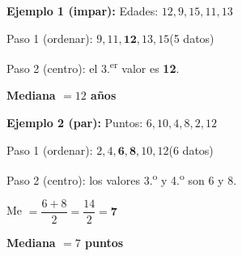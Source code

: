 \documentclass[12pt, letterpaper]{article}
\begin{document}
	\begin{ejemplo}
		\textbf{Ejemplo 1 (impar):}
		Edades: $12, 9, 15, 11, 13$
		
		Paso 1 (ordenar): $9, 11, \mathbf{12}, 13, 15$\quad (5 datos)
		
		Paso 2 (centro): el 3.\textsuperscript{er} valor es \textbf{12}.
		
		\textbf{Mediana $= 12$ años}
		
		\textbf{Ejemplo 2 (par):}
		Puntos: $6, 10, 4, 8, 2, 12$
		
		Paso 1 (ordenar): $2, 4, \mathbf{6, 8}, 10, 12$\quad (6 datos)
		
		Paso 2 (centro): los valores 3.\textsuperscript{o} y 4.\textsuperscript{o} son 6 y 8.
		
		Me $= \dfrac{6+8}{2} = \dfrac{14}{2} = \mathbf{7}$
		
		\textbf{Mediana $= 7$ puntos}
	\end{ejemplo}
	
\end{document}
